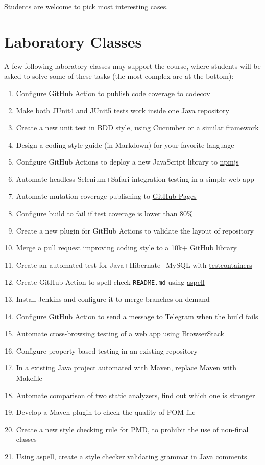 \documentclass[nobrand,anonymous,nodate,nosecurity]{huawei}
\begin{document}
{Students are welcome to pick most interesting cases.

\newpage
\section*{Laboratory Classes}

A few following laboratory classes may support the course, where students
will be asked to solve some of these tasks (the most complex are at the bottom):

\begin{enumerate}
	\item Configure GitHub Action to publish code coverage to \href{https://www.codecov.io}{codecov}
	\item Make both JUnit4 and JUnit5 tests work inside one Java repository
	\item Create a new unit test in BDD style, using Cucumber or a similar framework
	\item Design a coding style guide (in Markdown) for your favorite language
	\item Configure GitHub Actions to deploy a new JavaScript library to \href{https://npmjs.org}{npmjs}
	\item Automate headless Selenium+Safari integration testing in a simple web app
	\item Automate mutation coverage publishing to \href{https://pages.github.com}{GitHub Pages}
	\item Configure build to fail if test coverage is lower than 80\%
	\item Create a new plugin for GitHub Actions to validate the layout of repository
	\item Merge a pull request improving coding style to a 10k+ GitHub library
	\item Create an automated test for Java+Hibernate+MySQL with \href{https://www.testcontainers.org}{testcontainers}
	\item Create GitHub Action to spell check \texttt{README.md} using \href{http://aspell.net}{aspell}
	\item Install Jenkins and configure it to merge branches on demand
	\item Configure GitHub Action to send a message to Telegram when the build fails
	\item Automate cross-browsing testing of a web app using \href{https://www.browserstack.com}{BrowserStack}
	\item Configure property-based testing in an existing repository
	\item In a existing Java project automated with Maven, replace Maven with Makefile
	\item Automate comparison of two static analyzers, find out which one is stronger
	\item Develop a Maven plugin to check the quality of POM file
	\item Create a new style checking rule for PMD, to prohibit the use of non-final classes
	\item Using \href{http://aspell.net}{aspell}, create a style checker validating grammar in Java comments
\end{enumerate}

}
\end{document}
